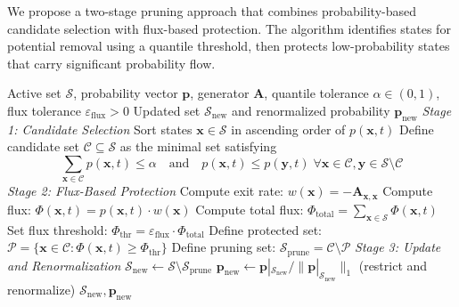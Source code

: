\documentclass[onefignum,onetabnum]{siamart171218}
\begin{document}
We propose a two-stage pruning approach that combines probability-based candidate selection with flux-based protection. The algorithm identifies states for potential removal using a quantile threshold, then protects low-probability states that carry significant probability flow.

\begin{algorithm}[H]
\caption{Flux-Preserving Pruning}
\label{alg:flux-prune}
\begin{algorithmic}[1]
\REQUIRE Active set $\mathcal{S}$, probability vector $\boldsymbol{p}$, generator $\mathbf{A}$, quantile tolerance $\alpha \in (0,1)$, flux tolerance $\varepsilon_{\mathrm{flux}} > 0$
\ENSURE Updated set $\mathcal{S}_{\mathrm{new}}$ and renormalized probability $\boldsymbol{p}_{\mathrm{new}}$
\STATE
\STATE \textit{Stage 1: Candidate Selection}
\STATE Sort states $\boldsymbol{x} \in \mathcal{S}$ in ascending order of $p(\boldsymbol{x}, t)$
\STATE Define candidate set $\mathcal{C} \subseteq \mathcal{S}$ as the minimal set satisfying
\begin{equation}
\sum_{\boldsymbol{x} \in \mathcal{C}} p(\boldsymbol{x}, t) \leq \alpha \quad \text{and} \quad p(\boldsymbol{x}, t) \leq p(\boldsymbol{y}, t) \; \forall \boldsymbol{x} \in \mathcal{C}, \boldsymbol{y} \in \mathcal{S} \setminus \mathcal{C}
\end{equation}
\STATE \textit{Stage 2: Flux-Based Protection}
    \STATE Compute exit rate: $w(\boldsymbol{x}) = -\mathbf{A}_{\boldsymbol{x},\boldsymbol{x}}$
    \STATE Compute flux: $\Phi(\boldsymbol{x}, t) = p(\boldsymbol{x}, t) \cdot w(\boldsymbol{x})$
\ENDFOR
\STATE Compute total flux: $\Phi_{\mathrm{total}} = \sum_{\boldsymbol{x} \in \mathcal{S}} \Phi(\boldsymbol{x}, t)$
\STATE Set flux threshold: $\Phi_{\mathrm{thr}} = \varepsilon_{\mathrm{flux}} \cdot \Phi_{\mathrm{total}}$
\STATE Define protected set: $\mathcal{P} = \{\boldsymbol{x} \in \mathcal{C} : \Phi(\boldsymbol{x}, t) \geq \Phi_{\mathrm{thr}}\}$
\STATE Define pruning set: $\mathcal{S}_{\mathrm{prune}} = \mathcal{C} \setminus \mathcal{P}$
\STATE
\STATE \textit{Stage 3: Update and Renormalization}
\STATE $\mathcal{S}_{\mathrm{new}} \gets \mathcal{S} \setminus \mathcal{S}_{\mathrm{prune}}$
\STATE $\boldsymbol{p}_{\mathrm{new}} \gets \boldsymbol{p}|_{\mathcal{S}_{\mathrm{new}}} / \|\boldsymbol{p}|_{\mathcal{S}_{\mathrm{new}}}\|_1$ \quad (restrict and renormalize)
\RETURN $\mathcal{S}_{\mathrm{new}}, \boldsymbol{p}_{\mathrm{new}}$
\end{algorithmic}
\end{algorithm}
\end{document}
